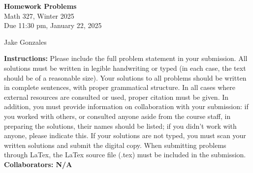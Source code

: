 \documentclass [10pt]{article}
\newcommand{\jg}[1]{{\color{blue} #1}}
\begin{document}
\begin{center}
{\bf Homework Problems}\\
Math 327, Winter 2025\\
Due 11:30 pm, January 22, 2025
\end{center}

\begin{center}
\jg{
    Jake Gonzales}
\end{center}

{\bf Instructions:} Please include the full problem statement in your submission.
All solutions must be written in legible handwriting
or typed (in each case, the text should be of a reasonable size). Your solutions to
all problems should be written in complete sentences, with proper grammatical
structure.
In all cases where external resources are consulted or used, proper citation must
be given. In addition,
you must provide information on collaboration with your submission: if you worked with others,
or consulted anyone aside from the course staff, in preparing the solutions, their
names should be
listed; if you didn't work with anyone, please indicate this.
If your solutions are not typed, you must scan your written solutions and submit
the digital copy. When submitting problems through LaTex, the LaTex source file
(.tex) must be included in the submission. \\

\jg{
\textbf{Collaborators: N/A }
}
\end{document}

